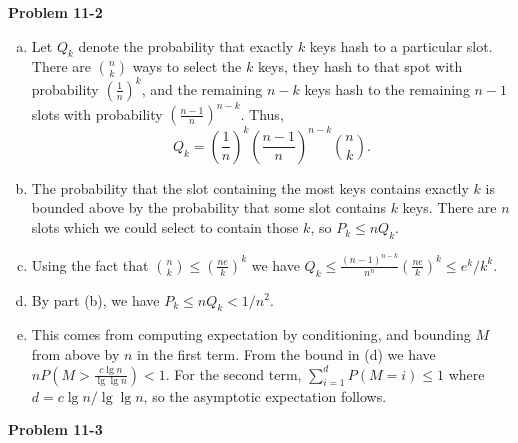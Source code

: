 \documentclass{article}
\begin{document}
\noindent\textbf{Problem 11-2}\\
\begin{enumerate}[a.]
\item Let $Q_k$ denote the probability that exactly $k$ keys hash to a particular slot.  There are ${n \choose k}$ ways to select the $k$ keys, they hash to that spot with probability $\left(\frac{1}{n}\right)^k$, and the remaining $n-k$ keys hash to the remaining $n-1$ slots with probability $\left(\frac{n-1}{n}\right)^{n-k}$. Thus,
\[ Q_k = \left(\frac{1}{n}\right)^k\left(\frac{n-1}{n}\right)^{n-k} {n \choose k}.\]

\item The probability that the slot containing the most keys contains exactly $k$ is bounded above by the probability that some slot contains $k$ keys. There are $n$ slots which we could select to contain those $k$, so $P_k \leq nQ_k$. 

\item Using the fact that ${n \choose k} \leq \left(\frac{ne}{k}\right)^k$ we have $Q_k \leq \frac{(n-1)^{n-k}}{n^n} \left(\frac{ne}{k}\right)^k \leq e^k/k^k$. 

\item  %
By part (b), we have $P_k \leq nQ_k < 1/n^2$.

\item This comes from computing expectation by conditioning, and bounding $M$ from above by $n$ in the first term.  From the bound in (d) we have $nP(M > \frac{c \lg n}{\lg \lg n}) < 1$.  For the second term, $\sum_{i=1}^d P(M = i) \leq 1$ where $d = c\lg n/ \lg \lg n$, so the asymptotic expectation follows. 

\end{enumerate}

\noindent\textbf{ Problem 11-3} \\
\end{document}
